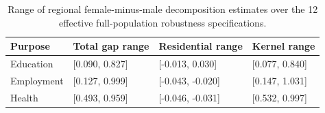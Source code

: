 \begin{table}
\caption{Range of regional female-minus-male decomposition estimates over the 12 effective full-population robustness specifications.}
\label{tab:s2_ranges}
\begin{tabular}{llll}
\toprule
Purpose & Total gap range & Residential range & Kernel range \\
\midrule
Education & [0.090, 0.827] & [-0.013, 0.030] & [0.077, 0.840] \\
Employment & [0.127, 0.999] & [-0.043, -0.020] & [0.147, 1.031] \\
Health & [0.493, 0.959] & [-0.046, -0.031] & [0.532, 0.997] \\
\bottomrule
\end{tabular}
\end{table}
